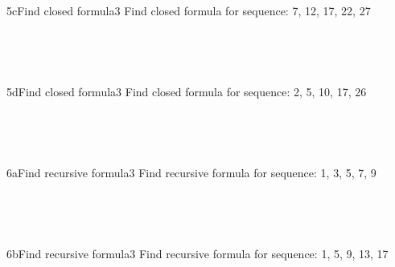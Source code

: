 \documentclass[a4paper,12pt]{book}
\begin{document}
    ~\\
    
    \hrulefill
    
    ~\\
    \begin{answersheetquestion}{5c}{Find closed formula}{3}
        Find closed formula for sequence: 7, 12, 17, 22, 27
        \iftoggle{answerkey}{ \begin{answer} $a_{n} = 5n+2$ \end{answer} }{ { ~\\ \raisebox{0pt}[2cm][0pt]{  } } }
    \end{answersheetquestion}
    
    ~\\
    
    \hrulefill
    
    ~\\
    \begin{answersheetquestion}{5d}{Find closed formula}{3}
        Find closed formula for sequence: 2, 5, 10, 17, 26
        \iftoggle{answerkey}{ \begin{answer} $a_{n} = n^{2} + 1$ \end{answer} }{ { ~\\ \raisebox{0pt}[2cm][0pt]{  } } }
    \end{answersheetquestion}

    ~\\
    
    \hrulefill
    
    ~\\
    \begin{answersheetquestion}{6a}{Find recursive formula}{3}
        Find recursive formula for sequence: 1, 3, 5, 7, 9
        \iftoggle{answerkey}{ \begin{answer} $a_{1} = 1$; $a_{n} = a_{n-1} + 2$ \end{answer} }{ { ~\\ \raisebox{0pt}[2cm][0pt]{  } } }
    \end{answersheetquestion}

    ~\\
    
    \hrulefill
    
    ~\\
    \begin{answersheetquestion}{6b}{Find recursive formula}{3}
        Find recursive formula for sequence: 1, 5, 9, 13, 17
        \iftoggle{answerkey}{ \begin{answer} $a_{1} = 1$; $a_{n} = a_{n-1} + 4$ \end{answer} }{ { ~\\ \raisebox{0pt}[2cm][0pt]{  } } }
    \end{answersheetquestion}
\end{document}
